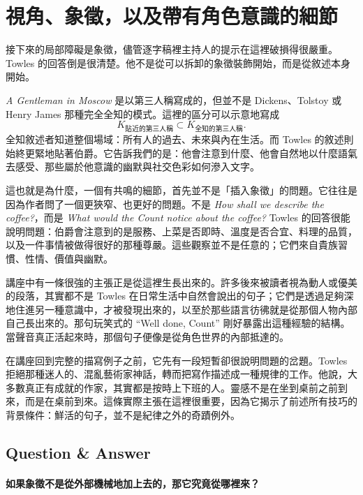 \section{視角、象徵，以及帶有角色意識的細節}

接下來的局部障礙是象徵，儘管逐字稿裡主持人的提示在這裡破損得很嚴重。Towles 的回答倒是很清楚。他不是從可以拆卸的象徵裝飾開始，而是從敘述本身開始。

\emph{A Gentleman in Moscow} 是以第三人稱寫成的，但並不是 Dickens、Tolstoy 或 Henry James 那種完全全知的模式。這裡的區分可以示意地寫成
\begin{equation}
K_{\text{貼近的第三人稱}} \subset K_{\text{全知的第三人稱}}.
\end{equation}
全知敘述者知道整個場域：所有人的過去、未來與內在生活。而 Towles 的敘述則始終更緊地貼著伯爵。它告訴我們的是：他會注意到什麼、他會自然地以什麼語氣去感受、那些屬於他意識的幽默與社交色彩如何滲入文字。

這也就是為什麼，一個有共鳴的細節，首先並不是「插入象徵」的問題。它往往是因為作者問了一個更狹窄、也更好的問題。不是 \emph{How shall we describe the coffee?}，而是 \emph{What would the Count notice about the coffee?} Towles 的回答很能說明問題：伯爵會注意到的是服務、上菜是否即時、溫度是否合宜、料理的品質，以及一件事情被做得很好的那種尊嚴。這些觀察並不是任意的；它們來自貴族習慣、性情、價值與幽默。

講座中有一條很強的主張正是從這裡生長出來的。許多後來被讀者視為動人或優美的段落，其實都不是 Towles 在日常生活中自然會說出的句子；它們是透過足夠深地住進另一種意識中，才被發現出來的，以至於那些語言彷彿就是從那個人物內部自己長出來的。那句玩笑式的 ``Well done, Count'' 剛好暴露出這種經驗的結構。當聲音真正活起來時，那個句子便像是從角色世界的內部抵達的。

在講座回到完整的描寫例子之前，它先有一段短暫卻很說明問題的岔題。Towles 拒絕那種迷人的、混亂藝術家神話，轉而把寫作描述成一種規律的工作。他說，大多數真正有成就的作家，其實都是按時上下班的人。靈感不是在坐到桌前之前到來，而是在桌前到來。這條實際主張在這裡很重要，因為它揭示了前述所有技巧的背景條件：鮮活的句子，並不是紀律之外的奇蹟例外。

\subsection{Question \& Answer}

\paragraph{如果象徵不是從外部機械地加上去的，那它究竟從哪裡來？}


